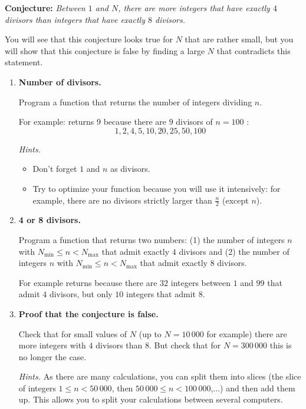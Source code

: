 \documentclass[11pt,class=report,crop=false]{standalone}
\begin{document}
\begin{activite}


\textbf{Conjecture: } \emph{Between $1$ and $N$, there are more integers that have exactly $4$ divisors than integers that have exactly $8$ divisors.}

You will see that this conjecture looks true for $N$ that are rather small, but you will show that this conjecture is false by finding a large $N$ that contradicts this statement.

\begin{enumerate}
  \item \textbf{Number of divisors.}
  
  Program a function  that returns the number of integers dividing $n$.
  
  For example:  returns $9$ because there are $9$ divisors of $n=100$ :
  $$1,2,4,5,10,20,25,50,100$$
  
  \emph{Hints.}
  \begin{itemize}
    \item Don't forget $1$ and $n$ as divisors.
    \item Try to optimize your function because you will use it intensively: for example, there are no divisors strictly larger than $\frac n2$ (except $n$).    
   \end{itemize}
   
   
   \item \textbf{4 or 8 divisors.}
   
   Program a function  that returns two numbers: (1) the number of integers $n$ with $N_{\text{min}} \le n < N_{\text{max}}$ that admit exactly $4$ divisors and (2) the number of integers $n$ with $N_{\text{min}} \le n < N_{\text{max}}$ that admit exactly $8$ divisors.
   
   For example  returns  because there are $32$ integers between $1$ and $99$ that admit $4$ divisors, but only $10$ integers that admit $8$.
   
   \item \textbf{Proof that the conjecture is false.}
   
   Check that for \og{}small\fg{} values of $N$ (up to $N = 10\,000$ for example) there are more integers with $4$ divisors than $8$. But check that for $N=300\,000$ this is no longer the case.
   
   \emph{Hints.} As there are many calculations, you can split them into slices (the slice of integers $1\le n < 50\,000$, then $50\,000 \le n < 100\,000$,...) and then add them up.
   This allows you to split your calculations between several computers.
   
\end{enumerate}   
     
\end{activite}
\end{document}
